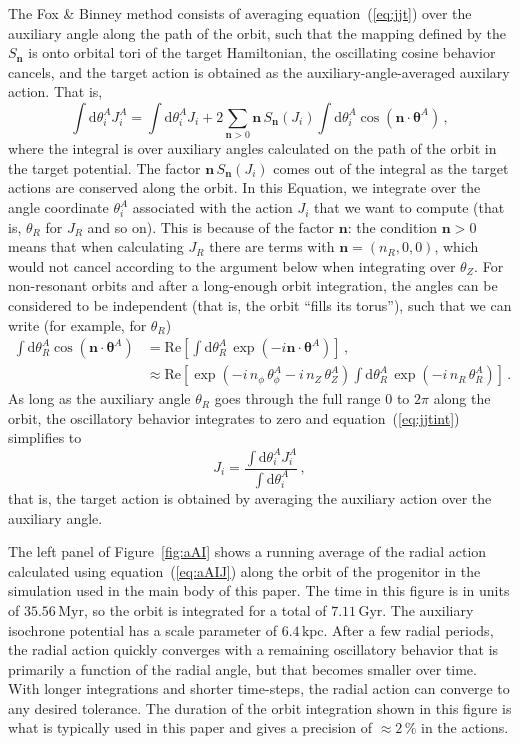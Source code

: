 \documentclass[12pt,preprint]{aastex}
\newcommand{\dd}{\mathrm{d}}
\newcommand{\eqnname}{equation}
\renewcommand{\figurename}{Figure}
\renewcommand{\vec}[1]{\ensuremath{\mathbf{#1}}}
\newcommand{\vecn}{\ensuremath{\vec{n}}}
\newcommand{\veca}{\ensuremath{\boldsymbol\theta}}
\newcommand{\Myr}{\ensuremath{\,\mathrm{Myr}}}
\newcommand{\Gyr}{\ensuremath{\,\mathrm{Gyr}}}
\newcommand{\kpc}{\ensuremath{\,\mathrm{kpc}}}
\begin{document}
The Fox \& Binney method consists of averaging \eqnname~(\ref{eq:jjt})
over the auxiliary angle along the path of the orbit, such that the
mapping defined by the $S_{\vecn}$ is onto orbital tori of the target
Hamiltonian, the oscillating cosine behavior cancels, and the target
action is obtained as the auxiliary-angle-averaged auxilary
action. That is,
\begin{equation}\label{eq:jjtint}
  \int \dd \theta_i^A J_i^A = \int \dd \theta_i^A J_i + 2 \sum_{\vecn > 0} \vecn\,S_{\vecn}(J_i)\int \dd \theta_i^A\cos(\vecn\cdot\veca^A)\,,
\end{equation}
where the integral is over auxiliary angles calculated on the path of
the orbit in the target potential. The factor $\vecn\,S_{\vecn}(J_i)$
comes out of the integral as the target actions are conserved along
the orbit. In this Equation, we integrate over the angle coordinate
$\theta_i^A$ associated with the action $J_i$ that we want to compute
(that is, $\theta_R$ for $J_R$ and so on). This is because of the
factor $\vecn$: the condition $\vecn > 0$ means that when calculating
$J_R$ there are terms with $\vecn = (n_R,0,0)$, which would not cancel
according to the argument below when integrating over $\theta_Z$. For
non-resonant orbits and after a long-enough orbit integration, the
angles can be considered to be independent (that is, the orbit ``fills
its torus''), such that we can write (for example, for $\theta_R$)
\begin{equation}
\begin{split}
  \int \dd \theta_R^A\cos(\vecn\cdot\veca^A) & = \mathrm{Re}\left[\int \dd \theta_R^A\,\exp(-i\vecn\cdot\veca^A)\right]\,, \\
  & \approx \mathrm{Re}\left[\exp(-i\,n_\phi\,\theta^A_\phi-i\,n_Z\,\theta^A_Z)\int \dd \theta_R^A\,\exp(-i\,n_R\,\theta^A_R)\right]\,.
\end{split}
\end{equation}
As long as the auxiliary angle $\theta_R$ goes through the full range
$0$ to $2\pi$ along the orbit, the oscillatory behavior integrates to
zero and \eqnname~(\ref{eq:jjtint}) simplifies to
\begin{equation}\label{eq:aAIJ}
  J_i = \frac{\int \dd \theta_i^A J_i^A}{\int \dd \theta_i^A}\,,
\end{equation}
that is, the target action is obtained by averaging the auxiliary
action over the auxiliary angle.

The left panel of \figurename~\ref{fig:aAI} shows a running average of
the radial action calculated using \eqnname~(\ref{eq:aAIJ}) along the
orbit of the progenitor in the simulation used in the main body of
this paper. The time in this figure is in units of $35.56\Myr$, so the
orbit is integrated for a total of $7.11\Gyr$. The auxiliary isochrone
potential has a scale parameter of $6.4\kpc$. After a few radial
periods, the radial action quickly converges with a remaining
oscillatory behavior that is primarily a function of the radial angle,
but that becomes smaller over time. With longer integrations and
shorter time-steps, the radial action can converge to any desired
tolerance. The duration of the orbit integration shown in this figure
is what is typically used in this paper and gives a precision of
$\approx2\,\%$ in the actions.
\end{document}
